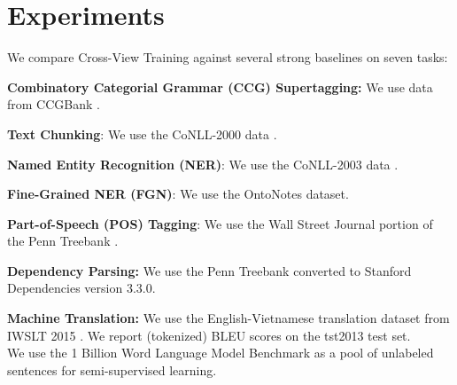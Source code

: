 \documentclass[11pt,a4paper]{article}
\begin{document}
\section{Experiments}
We compare Cross-View Training against several strong baselines on seven tasks:

\vspace{1.5mm}\noindent \textbf{Combinatory Categorial Grammar (CCG) Supertagging:} 
We use data from CCGBank \citep{hockenmaier2007ccgbank}.

\vspace{1.5mm}\noindent \textbf{Text Chunking}: 
We use the CoNLL-2000 data \citep{tjong2000introduction}.

\vspace{1.5mm}\noindent \textbf{Named Entity Recognition (NER)}: 
We use the CoNLL-2003 data \citep{tjong2003introduction}.

\vspace{1.5mm}\noindent \textbf{Fine-Grained NER (FGN)}: 
We use the OntoNotes \citep{hovy2006ontonotes} dataset.

\vspace{1.5mm}\noindent \textbf{Part-of-Speech (POS) Tagging}: 
We use the Wall Street Journal portion of the Penn Treebank \citep{marcus1993building}.

\vspace{1.5mm}\noindent \textbf{Dependency Parsing:} 
We use the Penn Treebank converted to Stanford Dependencies version 3.3.0.

\vspace{1.5mm}\noindent \textbf{Machine Translation:} We use the English-Vietnamese translation dataset from IWSLT 2015 \citep{iwslt15}.
We report (tokenized) BLEU scores on the tst2013 test set. \\

We use the 1 Billion Word Language Model Benchmark \citep{chelba2013one} as a pool of unlabeled sentences for semi-supervised learning. 
\end{document}
